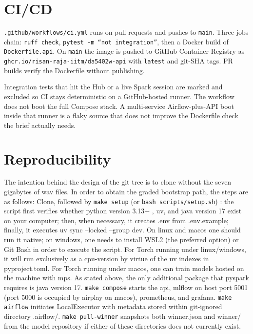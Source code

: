 \documentclass[conference]{IEEEtran}
\begin{document}
\section{CI/CD}
\label{sec:cicd}

\texttt{.github/workflows/ci.yml} runs on pull requests and pushes to \texttt{main}.
Three jobs chain: \texttt{ruff check}, \texttt{pytest -m ``not integration''}, then a Docker build of \texttt{Dockerfile.api}.
On \texttt{main} the image is pushed to GitHub Container Registry as \texttt{ghcr.io/risan-raja-iitm/da5402w-api} with \texttt{latest} and git-SHA tags.
PR builds verify the Dockerfile without publishing.

Integration tests that hit the Hub or a live Spark session are marked and excluded so CI stays deterministic on a GitHub-hosted runner.
The workflow does not boot the full Compose stack.
A multi-service Airflow-plus-API boot inside that runner is a flaky source that does not improve the Dockerfile check the brief actually needs.

\section{Reproducibility}
\label{sec:repro}
The intention behind the design of the git tree is to clone without the seven gigabytes of wav files.
In order to obtain the graded bootstrap path, the steps are as follows:
Clone, followed by \texttt{make setup} (or \texttt{bash scripts/setup.sh}) : the script first verifies whether python version 3.13+ , uv, and java version 17 exist on your computer; then, when necessary, it creates .env from .env.example; finally, it executes uv sync --locked --group dev.
On linux and macos one should run it native; on windows, one needs to install WSL2 (the preferred option) or Git Bash in order to execute the script.
For Torch running under linux/windows, it will run exclusively as a cpu-version by virtue of the uv indexes in pyproject.toml.
For Torch running under macos, one can train models hosted on the machine with mps.
As stated above, the only additional package that pyspark requires is java version 17.
\texttt{make compose} starts the api, mlflow on host port 5001 (port 5000 is occupied by airplay on macos), prometheus, and grafana.
\texttt{make airflow} initiates LocalExecutor with metadata stored within git-ignored directory .airflow/.
\texttt{make pull-winner} snapshots both winner.json and winner/ from the model repository if either of these directories does not currently exist.
\end{document}
